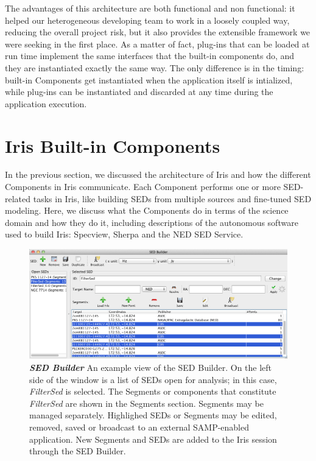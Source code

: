 \documentclass[final,5p]{elsarticle}
\begin{document}
The advantages of this architecture are both functional and non functional: it helped our heterogeneous developing team to work in a loosely coupled way, reducing the overall project risk, but it also provides the extensible framework we were seeking in the first place. As a matter of fact, plug-ins that can be loaded at run time implement the same interfaces that the built-in components do, and they are instantiated exactly the same way. The only difference is in the timing: built-in Components get instantiated when the application itself is intialized, while plug-ins can be instantiated and discarded at any time during the application execution.

\section{Iris Built-in Components}
\label{sec:components}
In the previous section, we discussed the architecture of Iris and how the different Components in Iris communicate. Each Component performs one or more SED-related tasks in Iris, like building SEDs from multiple sources and fine-tuned SED modeling.  Here, we discuss what the Components do in terms of the science domain and how they do it, including descriptions of the autonomous software used to build Iris: Specview, Sherpa and the NED SED Service.

\begin{figure}
\begin{center}
\includegraphics[width=\textwidth]{figures/sed_builder.png}
\caption{\textit{\textbf{SED Builder}} An example view of the SED Builder. On the left side of the window is a list of SEDs open for analysis; in this case, \textit{FilterSed} is selected. The Segments or components that constitute \textit{FilterSed} are shown in the Segments section. Segments may be managed separately. Highlighed SEDs or Segments may be edited, removed, saved or broadcast to an external SAMP-enabled application. New Segments and SEDs are added to the Iris session through the SED Builder. }
\label{fig:sed_builder}
\end{center}
\end{figure}
\end{document}
